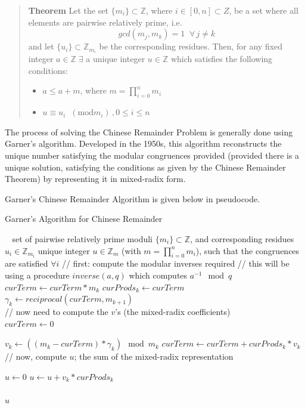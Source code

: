 \documentclass[letterpaper,12pt,titlepage,oneside,final]{book}
\newenvironment{theorem}{\begin{quote}%
  \textbf{Theorem }%
  \quad
}{%
\end{quote}%
}
\begin{document}
\begin{theorem}\label{Chinese Remainder Theorem}
  Let the set ${\{m_i\} \subset \mathbb{Z}}$, where ${i \in [0, n] \subset Z}$, be a set where all elements are pairwise relatively prime, i.e.
  \begin{equation*}
    gcd( m_j, m_k) = 1 \;\; \forall \, j \neq k
  \end{equation*}
  and let ${\{u_i\} \subset \mathbb{Z}_{m_i}}$ be the corresponding residues.  Then, for any fixed integer ${a \in \mathbb{Z} \; \exists}$ a unique integer ${u \in \mathbb{Z}}$ which satisfies the following conditions:
  \begin{itemize}
    \item ${a \leq a + m}$, where ${m = \prod_{i=0}^{n}m_i}$
    \item ${u \equiv u_i \;\; (\textrm{mod} m_i)\,, 0 \leq i \leq n}$
  \end{itemize}  
\end{theorem}

The process of solving the Chinese Remainder Problem is generally done using Garner's algorithm.  Developed in the 1950s, this algorithm reconstructs the unique number satisfying the modular congruences provided (provided there is a unique solution, satisfying the conditions as given by the Chinese Remainder Theorem) by representing it in mixed-radix form.  

Garner's Chinese Remainder Algorithm is given below in pseudocode.

\begin{algorithm}[H]
\caption{Garner's Algorithm for Chinese Remainder}\label{CRA}
\begin{algorithmic}[1]
\Input $\; \; $ set of pairwise relatively prime moduli ${\{m_i\} \subset \mathbb{Z}}$, and corresponding residues ${u_i \in \mathbb{Z}_{m_i}}$
\Output unique integer ${u \in \mathbb{Z}_m}$ (with ${m = \prod_{i=0}^{n}m_i}$), such that the congruences are satisfied ${\forall i}$  
\State // first: compute the modular inverses required
\State // this will be using a procedure $inverse( a, q)$ which computes ${a^{-1} \mod q}$
  \State $curTerm \gets curTerm * m_k$
  \State $curProds_k \gets curTerm$\\
  \State $\gamma_k \gets reciprocal( curTerm, m_{k+1})$
\EndFor\\

\State // now need to compute the $v$'s (the mixed-radix coefficients)\\
\State $curTerm \gets 0$

  \State $v_k \gets ((m_k - curTerm) * \gamma_k) \mod m_k$
  \State $curTerm \gets curTerm + curProds_k * v_k$
\EndFor\\

\State // now, compute $u$; the sum of the mixed-radix representation

\State $u \gets 0$
  \State $u \gets u + v_k * curProds_k$
\EndFor\\\\

\Return $u$
\EndProcedure
\end{algorithmic}
\end{algorithm} 
\end{document}
